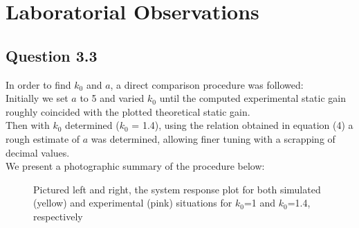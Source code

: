 \documentclass[a4paper,8pt]{extarticle}
\begin{document}
    \section{Laboratorial Observations}
         \subsection*{Question 3.3}
          In order to find $k_{0}$ and $a$, a direct comparison procedure was followed: \\
          Initially we set $a$ to 5 and varied $k_0$ until the computed experimental static gain roughly coincided with the plotted theoretical static gain.\\
          Then with $k_0$ determined ($k_0$ = 1.4), using the relation obtained in equation (4) a rough estimate of $a$ was determined, allowing finer tuning with a scrapping of decimal values.\\
          We present a photographic summary of the procedure below:
          \begin{figure}[ht]
            \centering
            \captionsetup{justification=centering}
            \qquad
        \caption{Pictured left and right, the system response plot for both simulated (yellow) and experimental (pink) situations for $k_0$=1 and $k_0$=1.4, respectively}
        \end{figure}
\end{document}
